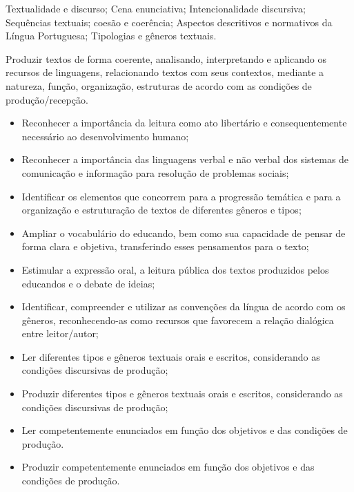 \begin{pud}

	
	\ementa	
	Textualidade e discurso; Cena enunciativa; Intencionalidade discursiva; Sequências textuais; coesão e coerência; Aspectos descritivos e normativos da Língua Portuguesa; Tipologias e gêneros textuais.
	
	\objetivos	
	Produzir textos de forma coerente, analisando, interpretando e aplicando os recursos de linguagens, relacionando textos com seus contextos, mediante a natureza, função, organização, estruturas de acordo com as condições de produção/recepção.
	
	\begin{itemize}
	  	\item Reconhecer a importância da leitura como ato libertário e consequentemente necessário ao desenvolvimento humano;
		\item Reconhecer a importância das linguagens verbal e não verbal dos sistemas de comunicação e informação para resolução de problemas sociais;
		\item Identificar os elementos que concorrem para a progressão temática e para a organização e estruturação de textos de diferentes gêneros e tipos;
		\item Ampliar o vocabulário do educando, bem como sua capacidade de pensar de forma clara e objetiva, transferindo esses pensamentos para o texto;
		\item Estimular a expressão oral, a leitura pública dos textos produzidos pelos educandos e o debate de ideias;
		\item Identificar, compreender e utilizar as convenções da língua de acordo com os gêneros, reconhecendo-as como recursos que favorecem a relação dialógica entre leitor/autor;
		\item Ler diferentes tipos e gêneros textuais orais e escritos, considerando as condições discursivas de produção;
		\item Produzir diferentes tipos e gêneros textuais orais e escritos, considerando as condições discursivas de produção;
		\item Ler competentemente enunciados em função dos objetivos e das condições de produção.
		\item Produzir competentemente enunciados em função dos objetivos e das condições de produção.
	\end{itemize}
	

\end{pud}
